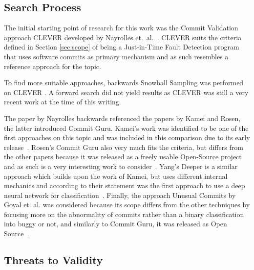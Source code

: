 \subsection{Search Process}
\label{sec:searchprocess}

The initial starting point of research for this work was the Commit Validation approach CLEVER developed by Nayrolles et.~al.~\cite{Nayrolles2018}. CLEVER suits the criteria defined in Section \ref{sec:scope} of being a Just-in-Time Fault Detection program that uses software commits as primary mechanism and as such resembles a reference approach for the topic.  

To find more suitable approaches, backwards Snowball Sampling was performed on CLEVER \cite{10.2307/2237615}. A forward search did not yield results as CLEVER was still a very recent work at the time of this writing.

The paper by Nayrolles backwards referenced the papers by Kamei and Rosen, the latter introduced Commit Guru. Kamei's work was identified to be one of the first approaches on this topic and was included in this comparison due to its early release~\cite{Kamei2013}. Rosen's Commit Guru also very much fits the criteria, but differs from the other papers because it was released as a freely usable Open-Source project and as such is a very interesting work to consider~\cite{Rosen2015}. Yang's Deeper is a similar approach which builds upon the work of Kamei, but uses different internal mechanics and according to their statement was the first approach to use a deep neural network for classification~\cite{Yang2015}. Finally, the approach Unusual Commits by Goyal et. al. was considered because its scope differs from the other techniques by focusing more on the abnormality of commits rather than a binary classification into buggy or not, and similarly to Commit Guru, it was released as Open Source~\cite{Goyal2017}.

\subsection{Threats to Validity}

